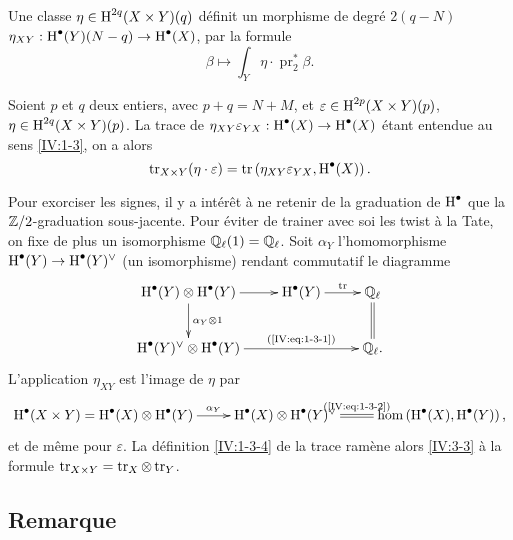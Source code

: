 \subsection{}\label{IV:3-2}

Une classe $\eta\in \operatorname{H}^{2 q}(X\times Y)(q)$ d\'efinit un morphisme de degr\'e 
$2(q-N)$ $\eta_{XY}:\operatorname{H}^\bullet(Y)(N-q)\to \operatorname{H}^\bullet(X)$, par la formule 
\[
  \beta \mapsto \int_Y \eta\cdot \operatorname{pr}_2^\ast \beta \text{.}
\]





\begin{proposition_}\label{IV:3-3}
Soient $p$ et $q$ deux entiers, avec $p+q=N+M$, et 
$\varepsilon\in \operatorname{H}^{2 p}(X\times Y)(p)$, $\eta\in \operatorname{H}^{2 q}(X\times Y)(p)$. La 
trace de $\eta_{X Y}\varepsilon_{Y X}:\operatorname{H}^\bullet(X)\to \operatorname{H}^\bullet(X)$ \'etant 
entendue au sens \ref{IV:1-3}, on a alors 
\[
  \operatorname{tr}_{X\times Y}(\eta\cdot \varepsilon) = \operatorname{tr}\left(\eta_{X Y}\varepsilon_{Y X},\operatorname{H}^\bullet(X)\right) \text{.}
\]
\end{proposition_}

Pour exorciser les signes, il y a int\'er\^et \`a ne retenir de la graduation 
de $\operatorname{H}^\bullet$ que la $\mathbb{Z}/2$-graduation sous-jacente. Pour \'eviter de 
trainer avec soi les twist \`a la Tate, on fixe de plus un isomorphisme 
$\mathbb{Q}_\ell(1)=\mathbb{Q}_\ell$. Soit $\alpha_Y$ l'homomorphisme 
$\operatorname{H}^\bullet(Y)\to \operatorname{H}^\bullet(Y)^\vee$ (un isomorphisme) rendant commutatif le 
diagramme 
\[\xymatrix{
  \h^\bullet(Y)\otimes \h^\bullet(Y) \ar[r] \ar[d]^-{\alpha_Y\otimes 1} 
    & \h^\bullet(Y) \ar[r]^-{\tr} 
    & \dQ_\ell \ar@{=}[d] \\
  \h^\bullet(Y)^\vee \otimes \h^\bullet(Y) \ar[rr]^-{\text{(\ref{IV:eq:1-3-1})}} 
    & & \dQ_\ell \text{.}
}\]
L'application $\eta_{X Y}$ est l'image de $\eta$ par 
\[\xymatrix{
  \h^\bullet(X\times Y) = \h^\bullet(X)\otimes \h^\bullet(Y) \ar[r]^-{\alpha_Y} 
    & \h^\bullet(X) \otimes \h^\bullet(Y)^\vee \ar@{=}[r]^-{\text{(\ref{IV:eq:1-3-2})}} 
    & \hom\left(\h^\bullet(X),\h^\bullet(Y)\right) \text{,}
}\]
et de m\^eme pour $\varepsilon$. La d\'efinition \ref{IV:1-3-4} de la trace 
ram\`ene alors \ref{IV:3-3} \`a la formule 
$\operatorname{tr}_{X\times Y}=\operatorname{tr}_X\otimes \operatorname{tr}_Y$. 





\subsection{Remarque}\label{IV:3-4}

